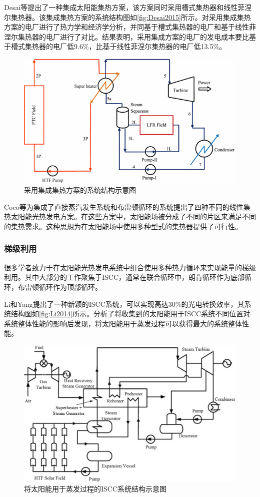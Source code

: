 Desai等\cite{Desai2015}提出了一种集成太阳能集热方案，该方案同时采用槽式集热器和线性菲涅尔集热器。该集成集热方案的系统结构图如\autoref{fig:Desai2015}所示。对采用集成集热方案的电厂进行了热力学和经济学分析，并同基于槽式集热器的电厂和基于线性菲涅尔集热器的电厂进行了对比。结果表明，采用集成方案的电厂的发电成本要比基于槽式集热器的电厂低9.6\%，比基于线性菲涅尔集热器的电厂低13.5\%。

\begin{figure}[!ht]
\centering
\includegraphics[width=.7\textwidth]{fig/Desai2015.jpg}
\caption{采用集成集热方案的系统结构示意图}\label{fig:Desai2015}
\end{figure}

Coco等\cite{Coco2015}为集成了直接蒸汽发生系统和布雷顿循环的系统提出了四种不同的线性集热太阳能光热发电方案。在这些方案中，太阳能场被分成了不同的片区来满足不同的集热需求。这种思想为在太阳能场中使用多种型式的集热器提供了可行性。

\subsubsection{梯级利用}

很多学者致力于在太阳能光热发电系统中组合使用多种热力循环来实现能量的梯级利用。其中大部分的工作聚焦于ISCC，通常在联合循环中，朗肯循环作为底部循环，布雷顿循环作为顶部循环。

Li和Yang\cite{Li2014}提出了一种新颖的ISCC系统，可以实现高达30\%的光电转换效率，其系统结构图如\autoref{fig:Li2014}所示。分析了将收集到的太阳能用于ISCC系统不同位置对系统整体性能的影响后发现，将太阳能用于蒸发过程可以获得最大的系统整体性能。
\begin{figure}[!ht]
\centering
\includegraphics[width=.8\textwidth]{fig/Li2014.jpg}
\caption{将太阳能用于蒸发过程的ISCC系统结构示意图}
\label{fig:Li2014}
\end{figure}

